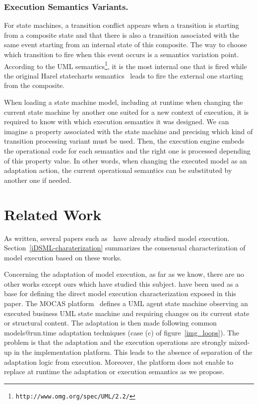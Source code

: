 \documentclass[english, 10pt]{llncs}
\begin{document}
\subsubsection{Execution Semantics Variants.}

For state machines, a transition conflict appears when a transition is
starting from a composite state and that there is also a transition
associated with the same event starting from an internal state of this
composite. The way to choose which transition to fire when this event
occurs is a semantics variation point. According to the UML
semantics\footnote{\texttt{http://www.omg.org/spec/UML/2.2/}}, it is
the most internal one that is fired while the original Harel
statecharts semantics~\cite{harel87} leads to fire the external one
starting from the composite.

When loading a state machine model, including at runtime when changing
the current state machine by another one suited for a new context of
execution, it is required to know with which execution semantics it
was designed. We can imagine a property associated with the state
machine and precising which kind of transition processing variant
must be used. Then, the execution engine embeds the operational code
for each semantics and the right one is processed depending of this
property value. In other words, when changing the executed model as an
adaptation action, the current operational semantics can be
substituted by another one if needed.

\section{Related Work}

As written, several papers such
as~\cite{breton01,cariou-ecmfa11,clarke-book-iDSML13,combemale-jos09,combemale-apsec12,engels00,lehmann10,pons00}
have already studied model
execution. Section~\ref{iDSML-charaterization} summarizes the
consensual characterization of model execution based on these works.

Concerning the adaptation of model execution, as far as we know, there
are no other works except ours which have studied this
subject. \cite{cariou-ciel12,cariou-mrt12} have been used as a base
for defining the direct model execution characterization exposed in
this paper. The MOCAS platform~\cite{BHB09} defines a UML agent state
machine observing an executed business UML state machine and requiring
changes on its current state or structural content. The adaptation is
then made following common models@run.time adaptation techniques
(case (c) of figure~\ref{img_loops}). The problem is that the
adaptation and the execution operations are strongly mixed-up in the
implementation platform. This leads to the absence of separation of
the adaptation logic from execution. Moreover, the platform does not
enable to replace at runtime the adaptation or execution semantics as
we propose.
\end{document}
